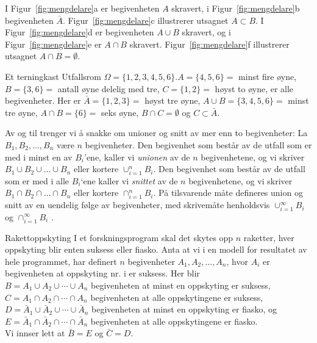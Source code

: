 I Figur~\ref{fig:mengdelare}a er begivenheten $A$ skravert, i Figur~\ref{fig:mengdelare}b begivenheten
$\bar{A}$. Figur~\ref{fig:mengdelare}c illustrerer utsagnet $A \subset B$. I Figur~\ref{fig:mengdelare}d er
begivenheten $A \cup B$ skravert, og i Figur~\ref{fig:mengdelare}e er $A \cap B$
skravert. Figur~\ref{fig:mengdelare}f illustrerer utsagnet $A \cap B = \emptyset$.\\


\begin{eksempel}{Et terningkast}
Utfallsrom $\Omega =\{1,2,3,4,5,6\}. A =\{4,5,6\} =$ minst fire
øyne, $B = \{3,6\} =$ antall øyne delelig med tre, $C = \{1,2\}
=$ høyst to øyne, er alle begivenheter. Her er $\bar{A} = \{1,2,3\} =$
høyst tre øyne, $A \cup B = \{3,4,5,6\} =$ minst tre øyne, $A
\cap B = \{6\} =$ seks øyne, $B \cap C = \emptyset $ og $C \subset \bar{A}$.
\end{eksempel}

\noindent Av og til trenger vi å snakke om unioner og snitt av mer enn to
begivenheter: La $B_1, B_2,\ldots , B_n$ være $n$ begivenheter. Den
begivenhet som består av de utfall som er med i minst en av
$B_i$'ene, kaller vi {\em unionen} av de $n$ begivenhetene, og vi
skriver $B_1 \cup B_2 \cup \ldots \cup B_n$ eller kortere  $\cup_{i=1}^{n}B_i$.
Den begivenhet som består av de utfall som er med i alle
$B_i$`ene kaller vi {\em snittet} av de $n$ begivenhetene, og vi
skriver $B_1 \cap B_2 \cap \ldots \cap B_n$ eller kortere  $\cap_{i=1}^{n}B_i$.
På tilsvarende måte defineres union og snitt av en uendelig følge
av begivenheter, med skrivemåte henholdsvis  $\cup_{i=1}^{\infty}B_i$ og
$\cap_{i=1}^{\infty}B_i$  . \\

\begin{eksempel}{Rakettoppskyting}
I et forskningsprogram skal det skytes opp $n$ raketter, hver
oppskyting blir enten suksess eller fiasko. Anta at vi i en
modell for resultatet av hele programmet, har definert $n$
begivenheter $A_1, A_2, \ldots, A_n$, hvor $A_i$ er begivenheten
at oppskyting nr. i er suksess. Her blir \\[1mm]
$B = A_1 \cup A_2 \cup \cdots \cup A_n$
    begivenheten at minst en oppskyting er suksess,\\
$C = A_1 \cap A_2 \cap \cdots \cap A_n$ begivenheten at alle     
                                   oppskytingene er suksess,\\
$D = \bar{A}_1 \cup \bar{A}_2 \cup \cdots \cup \bar{A}_n$
 begivenheten at minst en  oppskyting er fiasko, og \\
$E = \bar{A}_1 \cap \bar{A}_2 \cap \cdots \cap \bar{A}_n$
 begivenheten at alle oppskytingene er fiasko.\\[1mm]
Vi innser lett at $\bar{B} = E$ og $\bar{C} = D$.
\end{eksempel}

